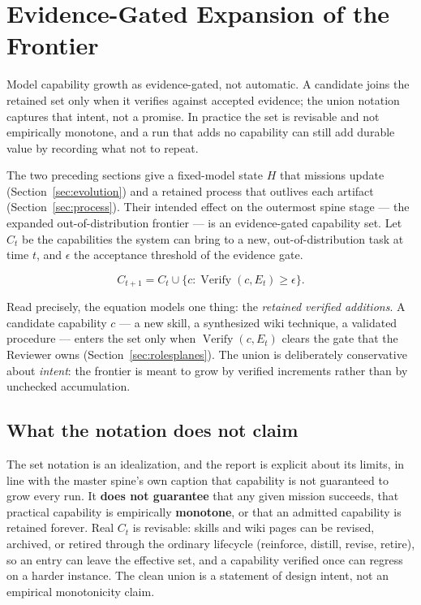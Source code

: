 \section{Evidence-Gated Expansion of the Frontier}
\label{sec:ood}\label{sec:frontier}

\begin{designbox}
Model capability growth as evidence-gated, not automatic. A candidate joins the
retained set only when it verifies against accepted evidence; the union notation
captures that intent, not a promise. In practice the set is revisable and not
empirically monotone, and a run that adds no capability can still add durable value
by recording what not to repeat.
\end{designbox}

The two preceding sections give a fixed-model state $H$ that missions update
(Section~\ref{sec:evolution}) and a retained process that outlives each artifact
(Section~\ref{sec:process}). Their intended effect on the outermost spine stage ---
the expanded out-of-distribution frontier --- is an evidence-gated capability set.
Let $C_t$ be the capabilities the system can bring to a new, out-of-distribution task
at time $t$, and $\epsilon$ the acceptance threshold of the evidence gate.

\begin{equation}
C_{t+1}
= C_t \cup
\{c:\operatorname{Verify}(c,E_t)\ge\epsilon\}.
\end{equation}

Read precisely, the equation models one thing: the \emph{retained verified additions}.
A candidate capability $c$ --- a new skill, a synthesized wiki technique, a validated
procedure --- enters the set only when $\operatorname{Verify}(c,E_t)$ clears the gate
that the Reviewer owns (Section~\ref{sec:rolesplanes}). The union is deliberately
conservative about \emph{intent}: the frontier is meant to grow by verified increments
rather than by unchecked accumulation.

\subsection{What the notation does not claim}

The set notation is an idealization, and the report is explicit about its limits, in
line with the master spine's own caption that capability is not guaranteed to grow
every run. It \textbf{does not guarantee} that any given mission succeeds, that
practical capability is empirically \textbf{monotone}, or that an admitted capability
is retained forever. Real $C_t$ is revisable: skills and wiki pages can be revised,
archived, or retired through the ordinary lifecycle (reinforce, distill, revise,
retire), so an entry can leave the effective set, and a capability verified once can
regress on a harder instance. The clean union is a statement of design intent, not an
empirical monotonicity claim.


